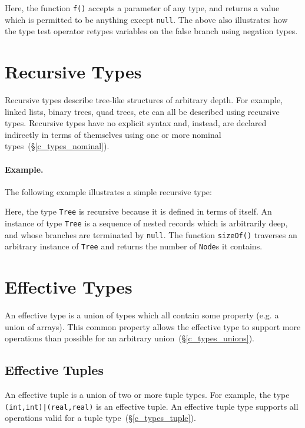 

Here, the function \lstinline{f()} accepts a parameter of any type, and returns a value which is permitted to be anything except \lstinline{null}.  The above also illustrates how the type test operator retypes variables on the false branch using negation types.

\section{Recursive Types}
\label{c_types_recursive}

Recursive types describe tree-like structures of arbitrary depth.  For example, linked lists, binary trees, quad trees, etc can all be described using recursive types.  Recursive types have no explicit syntax and, instead, are declared indirectly in terms of themselves using one or more nominal types~(\S\ref{c_types_nominal}).\\

\paragraph{Example.} The following example illustrates a simple recursive type:



Here, the type \lstinline{Tree} is recursive because it is defined in terms of itself.  An instance of type \lstinline{Tree} is a sequence of nested records which is arbitrarily deep, and whose branches are terminated by \lstinline{null}.  The function \lstinline{sizeOf()} traverses an arbitrary instance of \lstinline{Tree} and returns the number of \lstinline{Node}s it contains.

\section{Effective Types}
\label{c_types_effective}
An effective type is a union of types which all contain some property (e.g. a union of arrays).  This common property allows the effective type to support more operations than possible for an arbitrary union~(\S\ref{c_types_unions}).

\subsection{Effective Tuples}

An effective tuple is a union of two or more tuple types.  For example, the type \lstinline{(int,int)|(real,real)} is an effective tuple.  An effective tuple type supports all operations valid for a tuple type~(\S\ref{c_types_tuple}).

